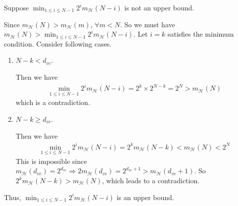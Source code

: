 \documentclass[12pt]{article}
\newcommand{\ParTh}[1]{\left(#1\right)}
\newcommand{\Floor}[1]{\left\lfloor#1\right\rfloor}
\newcommand{\Divide}[2]{\left.#1\middle/#2\right.}
\begin{document}

Suppose $\min_{1\leq i\leq N-1}2^im_{\mathcal{H}}\ParTh{N-i}$ is not an upper bound.

Since $m_{\mathcal{H}}\ParTh{N}>m_{\mathcal{H}}\ParTh{m}$, $\forall m<N$. So we must have $m_{\mathcal{H}}\ParTh{N}>\min_{1\leq i\leq N-1}2^im_{\mathcal{H}}\ParTh{N-i}$. Let $i=k$ satisfies the minimum condition. Consider following cases.
\begin{enumerate}
\item $N-k< d_{vc}$.

Then we have
\begin{align}
\min_{1\leq i\leq N-1}2^im_{\mathcal{H}}\ParTh{N-i}=2^k\times2^{N-k}=2^N>m_{\mathcal{H}}\ParTh{N}
\end{align}
which is a contradiction.
\item $N-k\geq d_{vc}$.

Then we have
\begin{align}
\min_{1\leq i\leq N-1}2^im_{\mathcal{H}}\ParTh{N-i}=2^km_{\mathcal{H}}\ParTh{N-k}<m_{\mathcal{H}}\ParTh{N}<2^N
\end{align}
This is impossible since $m_{\mathcal{H}}\ParTh{d_{vc}}=2^{d_{vc}}\Rightarrow2m_{\mathcal{H}}\ParTh{d_{vc}}=2^{d_{vc}+1}>m_{\mathcal{H}}\ParTh{d_{vc}+1}$. So $2^km_{\mathcal{H}}\ParTh{N-k}>m_{\mathcal{H}}\ParTh{N}$, which leads to a contradiction.

\end{enumerate}
Thus, $\min_{1\leq i\leq N-1}2^im_{\mathcal{H}}\ParTh{N-i}$ is an upper bound.
\end{document}
